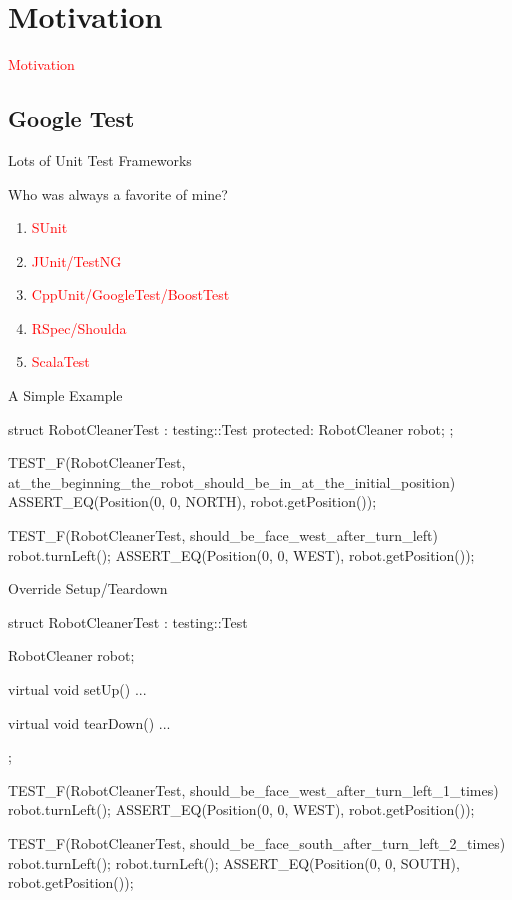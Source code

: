 \section{Motivation}
\label{sec:motivation}

\begin{frame}
  \begin{center}
    \Huge{\textcolor{red}{Motivation}}
  \end{center}
\end{frame}

\subsection{Google Test}

\begin{frame}{Lots of Unit Test Frameworks} 
 \begin{block}{Who was always a favorite of mine?} 
  \begin{enumerate}
    \item \textcolor{red}{SUnit}
    \item \textcolor{red}{JUnit/TestNG}
    \item \textcolor{red}{CppUnit/GoogleTest/BoostTest}
    \item \textcolor{red}{RSpec/Shoulda}
    \item \textcolor{red}{ScalaTest}
  \end{enumerate}
 \end{block}
\end{frame}

\begin{frame}[fragile]{A Simple Example}
\begin{c++}
struct RobotCleanerTest : testing::Test
{
protected:
    RobotCleaner robot;
};

TEST_F(RobotCleanerTest, at_the_beginning_the_robot_should_be_in_at_the_initial_position)
{
    ASSERT_EQ(Position(0, 0, NORTH), robot.getPosition());
}

TEST_F(RobotCleanerTest, should_be_face_west_after_turn_left)
{
   robot.turnLeft();
   ASSERT_EQ(Position(0, 0, WEST), robot.getPosition());
}
\end{c++}
\end{frame}

\begin{frame}[fragile]{Override Setup/Teardown}
\begin{c++}
struct RobotCleanerTest : testing::Test
{
    RobotCleaner robot;

    virtual void setUp()
    { ... }

    virtual void tearDown()
    { ... }
};

TEST_F(RobotCleanerTest, should_be_face_west_after_turn_left_1_times)
{
    robot.turnLeft();
    ASSERT_EQ(Position(0, 0, WEST), robot.getPosition());
}

TEST_F(RobotCleanerTest, should_be_face_south_after_turn_left_2_times)
{
    robot.turnLeft();
    robot.turnLeft();
    ASSERT_EQ(Position(0, 0, SOUTH), robot.getPosition());
}
\end{c++}
\end{frame}

